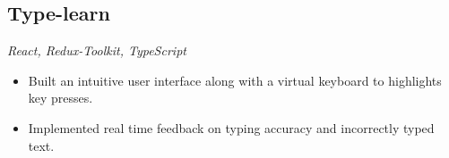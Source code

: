 \documentclass[a4paper]{article}
\begin{document}

\subsection{Type-learn}
\textit{React, Redux-Toolkit, TypeScript}
\hfill
\href{https://type-learn.netlify.app/}{ \faLink }
\textbar
\href{https://github.com/jatinkumar-me/type-learn}{ \faCode}
\begin{itemize}
	\item Built an intuitive user interface along with a virtual keyboard to highlights key presses.
	\item Implemented real time feedback on typing accuracy and incorrectly typed text.
\end{itemize}

\end{document}
